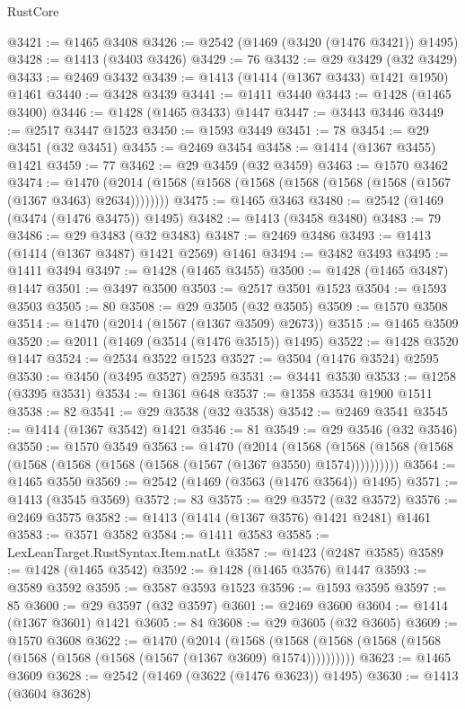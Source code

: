 \begin{lexlean}{RustCore}
\begin{coremodule}
@3421 := @1465 @3408
@3426 := @2542 (@1469 (@3420 (@1476 @3421)) @1495)
@3428 := @1413 (@3403 @3426)
@3429 := 76
@3432 := @29 @3429 (@32 @3429)
@3433 := @2469 @3432
@3439 := @1413 (@1414 (@1367 @3433) @1421 @1950) @1461
@3440 := @3428 @3439
@3441 := @1411 @3440
@3443 := @1428 (@1465 @3400)
@3446 := @1428 (@1465 @3433) @1447
@3447 := @3443 @3446
@3449 := @2517 @3447 @1523
@3450 := @1593 @3449
@3451 := 78
@3454 := @29 @3451 (@32 @3451)
@3455 := @2469 @3454
@3458 := @1414 (@1367 @3455) @1421
@3459 := 77
@3462 := @29 @3459 (@32 @3459)
@3463 := @1570 @3462
@3474 := @1470 (@2014 (@1568 (@1568 (@1568 (@1568 (@1568 (@1568 (@1567 (@1367 @3463) @2634))))))))
@3475 := @1465 @3463
@3480 := @2542 (@1469 (@3474 (@1476 @3475)) @1495)
@3482 := @1413 (@3458 @3480)
@3483 := 79
@3486 := @29 @3483 (@32 @3483)
@3487 := @2469 @3486
@3493 := @1413 (@1414 (@1367 @3487) @1421 @2569) @1461
@3494 := @3482 @3493
@3495 := @1411 @3494
@3497 := @1428 (@1465 @3455)
@3500 := @1428 (@1465 @3487) @1447
@3501 := @3497 @3500
@3503 := @2517 @3501 @1523
@3504 := @1593 @3503
@3505 := 80
@3508 := @29 @3505 (@32 @3505)
@3509 := @1570 @3508
@3514 := @1470 (@2014 (@1567 (@1367 @3509) @2673))
@3515 := @1465 @3509
@3520 := @2011 (@1469 (@3514 (@1476 @3515)) @1495)
@3522 := @1428 @3520 @1447
@3524 := @2534 @3522 @1523
@3527 := @3504 (@1476 @3524) @2595
@3530 := @3450 (@3495 @3527) @2595
@3531 := @3441 @3530
@3533 := @1258 (@3395 @3531)
@3534 := @1361 @648
@3537 := @1358 @3534 @1900 @1511
@3538 := 82
@3541 := @29 @3538 (@32 @3538)
@3542 := @2469 @3541
@3545 := @1414 (@1367 @3542) @1421
@3546 := 81
@3549 := @29 @3546 (@32 @3546)
@3550 := @1570 @3549
@3563 := @1470
    (@2014
      (@1568 (@1568 (@1568 (@1568 (@1568 (@1568 (@1568 (@1568 (@1567 (@1367 @3550) @1574))))))))))
@3564 := @1465 @3550
@3569 := @2542 (@1469 (@3563 (@1476 @3564)) @1495)
@3571 := @1413 (@3545 @3569)
@3572 := 83
@3575 := @29 @3572 (@32 @3572)
@3576 := @2469 @3575
@3582 := @1413 (@1414 (@1367 @3576) @1421 @2481) @1461
@3583 := @3571 @3582
@3584 := @1411 @3583
@3585 := LexLeanTarget.RustSyntax.Item.natLt
@3587 := @1423 (@2487 @3585)
@3589 := @1428 (@1465 @3542)
@3592 := @1428 (@1465 @3576) @1447
@3593 := @3589 @3592
@3595 := @3587 @3593 @1523
@3596 := @1593 @3595
@3597 := 85
@3600 := @29 @3597 (@32 @3597)
@3601 := @2469 @3600
@3604 := @1414 (@1367 @3601) @1421
@3605 := 84
@3608 := @29 @3605 (@32 @3605)
@3609 := @1570 @3608
@3622 := @1470
    (@2014
      (@1568 (@1568 (@1568 (@1568 (@1568 (@1568 (@1568 (@1568 (@1567 (@1367 @3609) @1574))))))))))
@3623 := @1465 @3609
@3628 := @2542 (@1469 (@3622 (@1476 @3623)) @1495)
@3630 := @1413 (@3604 @3628)

\end{coremodule}
\end{lexlean}
